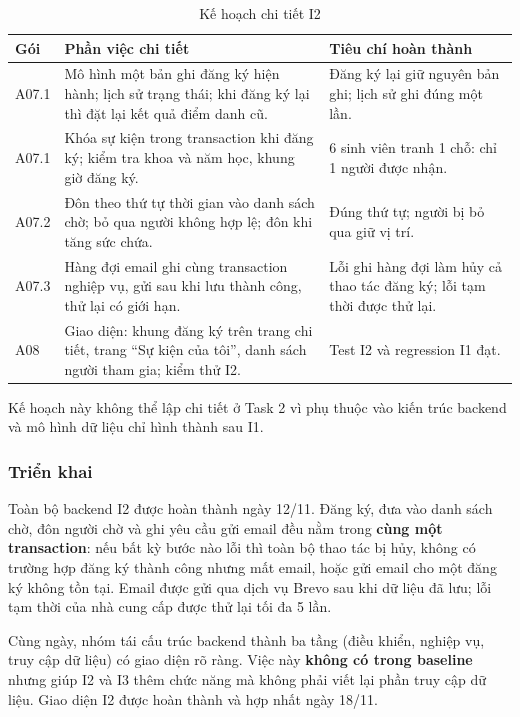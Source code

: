 \begin{table}[H]
\centering\small
\caption{Kế hoạch chi tiết I2}\label{tab:t3-lower-i2}
\begin{tabularx}{\linewidth}{@{}p{.09\linewidth}Xp{.32\linewidth}@{}}
\toprule
\textbf{Gói} & \textbf{Phần việc chi tiết} & \textbf{Tiêu chí hoàn thành}\\\midrule
A07.1 & Mô hình một bản ghi đăng ký hiện hành; lịch sử trạng thái; khi đăng ký lại thì đặt lại kết quả điểm danh cũ. & Đăng ký lại giữ nguyên bản ghi; lịch sử ghi đúng một lần.\\
A07.1 & Khóa sự kiện trong transaction khi đăng ký; kiểm tra khoa và năm học, khung giờ đăng ký. & 6 sinh viên tranh 1 chỗ: chỉ 1 người được nhận.\\
A07.2 & Đôn theo thứ tự thời gian vào danh sách chờ; bỏ qua người không hợp lệ; đôn khi tăng sức chứa. & Đúng thứ tự; người bị bỏ qua giữ vị trí.\\
A07.3 & Hàng đợi email ghi cùng transaction nghiệp vụ, gửi sau khi lưu thành công, thử lại có giới hạn. & Lỗi ghi hàng đợi làm hủy cả thao tác đăng ký; lỗi tạm thời được thử lại.\\
A08 & Giao diện: khung đăng ký trên trang chi tiết, trang ``Sự kiện của tôi'', danh sách người tham gia; kiểm thử I2. & Test I2 và regression I1 đạt.\\
\bottomrule
\end{tabularx}
\end{table}

Kế hoạch này không thể lập chi tiết ở Task 2 vì phụ thuộc vào kiến trúc backend và mô hình dữ liệu chỉ hình thành sau I1.

\subsubsection{Triển khai}

Toàn bộ backend I2 được hoàn thành ngày 12/11. Đăng ký, đưa vào danh sách chờ, đôn người chờ và ghi yêu cầu gửi email đều nằm trong \textbf{cùng một transaction}: nếu bất kỳ bước nào lỗi thì toàn bộ thao tác bị hủy, không có trường hợp đăng ký thành công nhưng mất email, hoặc gửi email cho một đăng ký không tồn tại. Email được gửi qua dịch vụ Brevo sau khi dữ liệu đã lưu; lỗi tạm thời của nhà cung cấp được thử lại tối đa 5 lần.

Cùng ngày, nhóm tái cấu trúc backend thành ba tầng (điều khiển, nghiệp vụ, truy cập dữ liệu) có giao diện rõ ràng. Việc này \textbf{không có trong baseline} nhưng giúp I2 và I3 thêm chức năng mà không phải viết lại phần truy cập dữ liệu. Giao diện I2 được hoàn thành và hợp nhất ngày 18/11.

